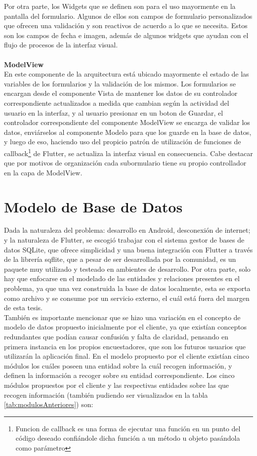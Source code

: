 Por otra parte, los Widgets que se definen son para el uso mayormente en la pantalla del formulario. Algunos de ellos son campos de formulario personalizados que
ofrecen una validación y son reactivos de acuerdo a lo que se necesita. Estos son los campos de fecha e imagen, además de algunos widgets que ayudan con el flujo
de procesos de la interfaz visual.
\\\\
\textbf{ModelView}\\
En este componente de la arquitectura está ubicado mayormente el estado de las variables de los formularios y la validación de los mismos. Los formularios se encargan
desde el componente Vista de mantener los datos de su controlador correspondiente actualizados a medida que cambian según la actividad del usuario en la interfaz,
y al usuario presionar en un boton de Guardar, el controlador correspondiente del componente ModelView se encarga de validar los datos, enviárselos al componente Modelo
para que los guarde en la base de datos, y luego de eso, haciendo uso del propicio patrón de utilización de funciones de callback\footnote{Funcion de callback es una
    forma de ejecutar una función en un punto del código deseado confiándole dicha función a un método u objeto pasándola como parámetro} de Flutter, se actualiza la interfaz
visual en consecuencia. Cabe destacar que por motivos de organización cada subormulario tiene su propio controllador en la capa de ModelView.
\\
\section{Modelo de Base de Datos} \label{section:dataModel}
Dada la naturaleza del problema: desarrollo en Android, desconexión de internet; y la naturaleza de Flutter, se escogió trabajar con el sistema gestor de bases de datos SQLite,
que ofrece simplicidad y una buena integración con Flutter a través de la librería sqflite, que a pesar de ser desarrollada por la comunidad, es un paquete muy utilizado y
testeado en ambientes de desarrollo. Por otra parte, solo hay que enfocarse en el modelado de las entidades y relaciones presentes en el problema, ya que una vez construida
la base de datos localmente, esta se exporta como archivo y se consume por un servicio externo, el cuál está fuera del margen de esta tesis.\\
También es importante mencionar que se hizo una variación en el concepto de modelo de datos propuesto inicialmente por el cliente, ya que existían conceptos redundantes que podían
causar confusión y falta de claridad, pensando en primera instancia en los propios encuestadores, que son los futuros usuarios que utilizarán la aplicación final. En el modelo propuesto
por el cliente existían cinco módulos los cuáles poseen una entidad sobre la cuál recogen información, y definen la información a recoger sobre su entidad correspondiente.
Los cinco módulos propuestos por el cliente y las respectivas entidades sobre las que recogen información (también pudiendo ser visualizados en la tabla \ref{tab:modulosAnteriores}) son:
\pagebreak


